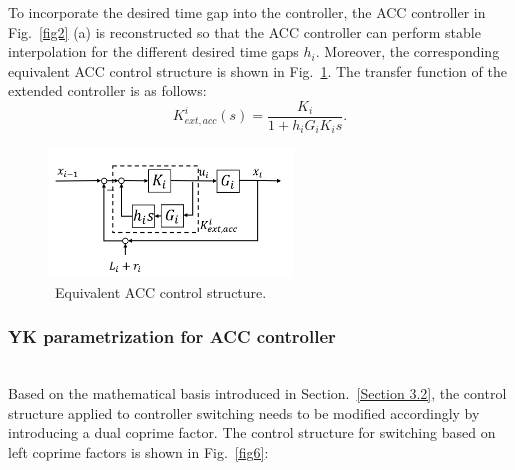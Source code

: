 \documentclass[journal]{IEEEtran}
\begin{document}
To incorporate the desired time gap into the controller, the ACC controller in Fig.~\ref{fig2} (a) is reconstructed so that the ACC controller can perform stable interpolation for the different desired time gaps $h_i$. Moreover, the corresponding equivalent ACC control structure is shown in Fig.~\ref{fig5}. The transfer function of the extended controller is as follows:
\begin{equation}
  K_{e x t, a c c}^{i}(s)=\frac{K_{i}}{1+h_{i} G_{i} K_{i} s}.
\end{equation}
\begin{figure}
  \centering
  \includegraphics[width=6.5cm]{figs/fig5.png}
  \caption{~Equivalent ACC control structure.}
  \label{fig5}
\end{figure}

\subsubsection{YK parametrization for ACC controller}
\label{Section 4.2.2}
~\\

Based on the mathematical basis introduced in Section.~\ref{Section 3.2}, the control structure applied to controller switching needs to be modified accordingly by introducing a dual coprime factor. The control structure for switching based on left coprime factors is shown in Fig.~\ref{fig6}:
\end{document}
